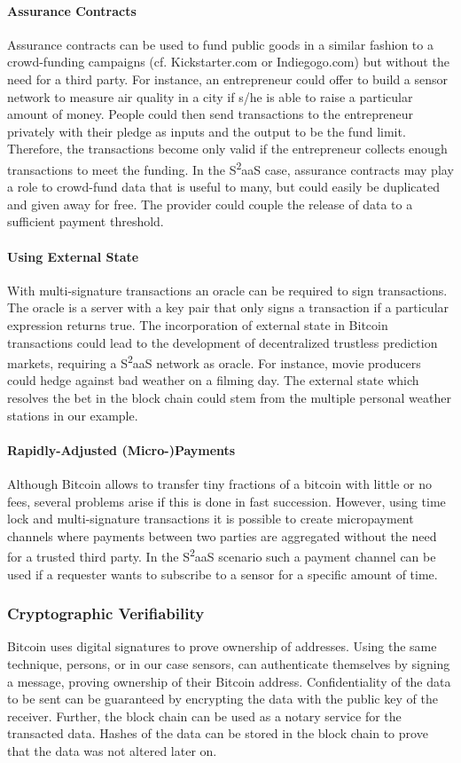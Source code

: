 \paragraph{Assurance Contracts}
Assurance contracts can be used to fund public goods in a similar fashion to a crowd-funding campaigns (cf. Kickstarter.com or Indiegogo.com) but without the need for a third party. For instance, an entrepreneur could offer to build a sensor network to measure air quality in a city if s/he is able to raise a particular amount of money. People could then send transactions to the entrepreneur privately with their pledge as inputs and the output to be the fund limit. Therefore, the transactions become only valid if the entrepreneur collects enough transactions to meet the funding. In the S\textsuperscript{2}aaS case, assurance contracts may play a role to crowd-fund data that is useful to many, but could easily be duplicated and given away for free. The provider could couple the release of data to a sufficient payment threshold.
\paragraph{Using External State}
With multi-signature transactions an oracle can be required to sign transactions. The oracle is a server with a key pair that only signs a transaction if a particular expression returns true. The incorporation of external state in Bitcoin transactions could lead to the development of decentralized trustless prediction markets, requiring a S\textsuperscript{2}aaS network as oracle. For instance, movie producers could hedge against bad weather on a filming day. The external state which resolves the bet in the block chain could stem from the multiple personal weather stations in our example.
\paragraph{Rapidly-Adjusted (Micro-)Payments}
Although Bitcoin allows to transfer tiny fractions of a bitcoin with little or no fees, several problems arise if this is done in fast succession. However, using time lock and multi-signature transactions it is possible to create micropayment channels where payments between two parties are aggregated without the need for a trusted third party. In the S\textsuperscript{2}aaS scenario such a payment channel can be used if a requester wants to subscribe to a sensor for a specific amount of time.

\subsubsection{Cryptographic Verifiability}
Bitcoin uses digital signatures to prove ownership of addresses. Using the same technique, persons, or in our case sensors, can authenticate themselves by signing a message, proving ownership of their Bitcoin address. Confidentiality of the data to be sent can be guaranteed by encrypting the data with the public key of the receiver. Further, the block chain can be used as a notary service for the transacted data. Hashes of the data can be stored in the block chain to prove that the data was not altered later on.

